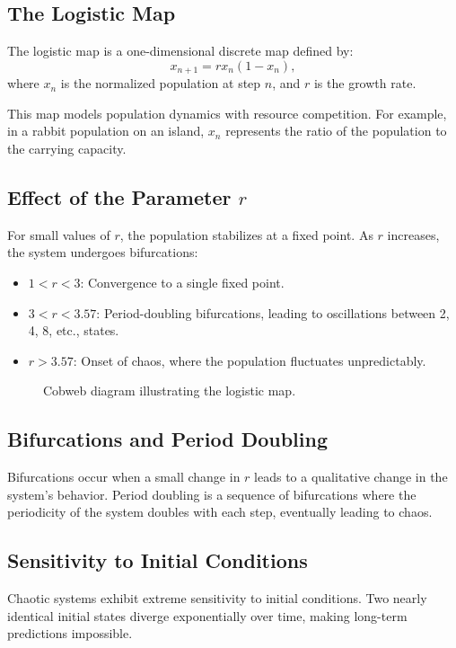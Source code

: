 \documentclass{article}
\begin{document}
\subsection{The Logistic Map}
The logistic map is a one-dimensional discrete map defined by:
\[
x_{n+1} = r x_n (1 - x_n),
\]
where $x_n$ is the normalized population at step $n$, and $r$ is the growth rate.

This map models population dynamics with resource competition. For example, in a rabbit population on an island, $x_n$ represents the ratio of the population to the carrying capacity.

\subsection{Effect of the Parameter $r$}
For small values of $r$, the population stabilizes at a fixed point. As $r$ increases, the system undergoes bifurcations:
\begin{itemize}
  \item $1 < r < 3$: Convergence to a single fixed point.
  \item $3 < r < 3.57$: Period-doubling bifurcations, leading to oscillations between 2, 4, 8, etc., states.
  \item $r > 3.57$: Onset of chaos, where the population fluctuates unpredictably.
\end{itemize}

\begin{figure}[h!]
\centering
{}
\caption{Cobweb diagram illustrating the logistic map.}
\end{figure}

\subsection{Bifurcations and Period Doubling}
Bifurcations occur when a small change in $r$ leads to a qualitative change in the system's behavior. Period doubling is a sequence of bifurcations where the periodicity of the system doubles with each step, eventually leading to chaos.

\subsection{Sensitivity to Initial Conditions}
Chaotic systems exhibit extreme sensitivity to initial conditions. Two nearly identical initial states diverge exponentially over time, making long-term predictions impossible.
\end{document}
